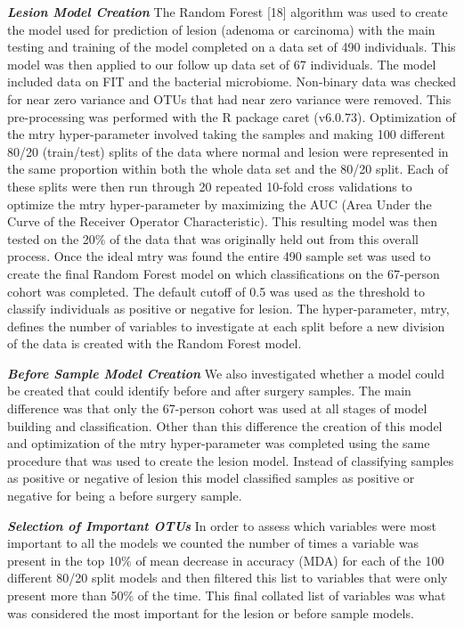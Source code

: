 \documentclass[12pt,]{article}
\begin{document}
\textbf{\emph{Lesion Model Creation}} The Random Forest {[}18{]}
algorithm was used to create the model used for prediction of lesion
(adenoma or carcinoma) with the main testing and training of the model
completed on a data set of 490 individuals. This model was then applied
to our follow up data set of 67 individuals. The model included data on
FIT and the bacterial microbiome. Non-binary data was checked for near
zero variance and OTUs that had near zero variance were removed. This
pre-processing was performed with the R package caret (v6.0.73).
Optimization of the mtry hyper-parameter involved taking the samples and
making 100 different 80/20 (train/test) splits of the data where normal
and lesion were represented in the same proportion within both the whole
data set and the 80/20 split. Each of these splits were then run through
20 repeated 10-fold cross validations to optimize the mtry
hyper-parameter by maximizing the AUC (Area Under the Curve of the
Receiver Operator Characteristic). This resulting model was then tested
on the 20\% of the data that was originally held out from this overall
process. Once the ideal mtry was found the entire 490 sample set was
used to create the final Random Forest model on which classifications on
the 67-person cohort was completed. The default cutoff of 0.5 was used
as the threshold to classify individuals as positive or negative for
lesion. The hyper-parameter, mtry, defines the number of variables to
investigate at each split before a new division of the data is created
with the Random Forest model.

\textbf{\emph{Before Sample Model Creation}} We also investigated
whether a model could be created that could identify before and after
surgery samples. The main difference was that only the 67-person cohort
was used at all stages of model building and classification. Other than
this difference the creation of this model and optimization of the mtry
hyper-parameter was completed using the same procedure that was used to
create the lesion model. Instead of classifying samples as positive or
negative of lesion this model classified samples as positive or negative
for being a before surgery sample.

\textbf{\emph{Selection of Important OTUs}} In order to assess which
variables were most important to all the models we counted the number of
times a variable was present in the top 10\% of mean decrease in
accuracy (MDA) for each of the 100 different 80/20 split models and then
filtered this list to variables that were only present more than 50\% of
the time. This final collated list of variables was what was considered
the most important for the lesion or before sample models.
\end{document}
